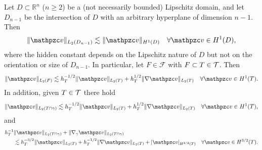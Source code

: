 \begin{lemma}
\label{L:trace-est}
Let $D\subset \mathbb{R}^n$ ($n \ge 2$) be a (not necessarily bounded) Lipschitz domain, and let $D_{n-1}$ be the intersection of $D$ with an arbitrary hyperplane of dimension $n-1$.  Then
\begin{align}
\label{general_trace_est}
\|\tv \|_{L_2(D_{n-1})} \lesssim \|\tv\|_{H^1(D)} \quad \forall \tv \in H^1(D),
\end{align}
where the hidden constant depends on the Lipschitz nature of $D$ but not on the orientation or size of $D_{n-1}$.  In particular, let $F \in \mathcal{F}$ with $F \subset T \in \mathcal{T}$. Then
\begin{align}
\label{trace_est}
\|\tv\|_{L_2(F)} \lesssim h_T^{-1/2} \|\tv\|_{L_2(T)} + h_T^{1/2}\|\nabla \tv \|_{L_2(T)}
\quad \forall \tv \in H^1(T).
\end{align}
In addition, given $T \in \mathcal{T}$ there hold
\begin{align}
\label{curved_trace_est} 
\|\tv\|_{L_2(T \cap \gamma)} \lesssim h_T^{-1/2} \|\tv\|_{L_2(T)}+ h_T^{1/2} \|\nabla \tv\|_{L_2(T)} \quad \forall \tv \in H^1(T),
\end{align}
and
\begin{align}
\begin{aligned}
\label{H32_curved_trace}
h_T^{-1} & \|\tv\|_{L_2(T \cap \gamma)}  + \|\nabla_\gamma \tv\|_{L_2(T \cap \gamma)} 
\\ & \lesssim h_T^{-3/2} \|\tv\|_{L_2(T)} + h_T^{-1/2} \|\nabla \tv\|_{L_2(T)} + |\tv|_{H^{3/2}(T)} \quad\forall \tv \in H^{3/2}(T).
\end{aligned}
\end{align}
\end{lemma}

